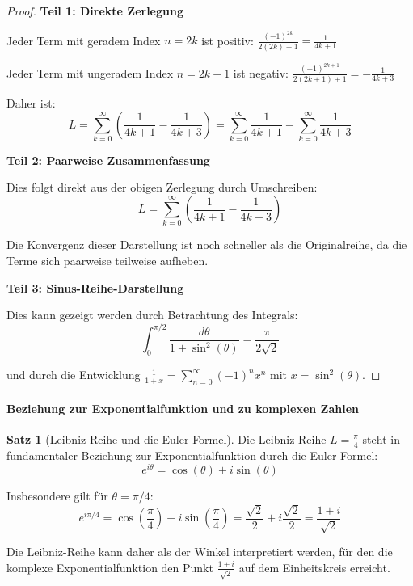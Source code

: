 \documentclass[a4paper,12pt,twoside]{report}
\theoremstyle{definition}
\newtheorem{satz}{Satz}
\begin{document}
\begin{proof}
\textbf{Teil 1: Direkte Zerlegung}

Jeder Term mit geradem Index $n = 2k$ ist positiv: $\frac{(-1)^{2k}}{2(2k)+1} = \frac{1}{4k+1}$

Jeder Term mit ungeradem Index $n = 2k+1$ ist negativ: $\frac{(-1)^{2k+1}}{2(2k+1)+1} = -\frac{1}{4k+3}$

Daher ist:
\begin{equation}
L = \sum_{k=0}^{\infty} \left( \frac{1}{4k+1} - \frac{1}{4k+3} \right) = \sum_{k=0}^{\infty} \frac{1}{4k+1} - \sum_{k=0}^{\infty} \frac{1}{4k+3}
\end{equation}

\textbf{Teil 2: Paarweise Zusammenfassung}

Dies folgt direkt aus der obigen Zerlegung durch Umschreiben:
\begin{equation}
L = \sum_{k=0}^{\infty} \left( \frac{1}{4k+1} - \frac{1}{4k+3} \right)
\end{equation}

Die Konvergenz dieser Darstellung ist noch schneller als die Originalreihe, da die Terme sich paarweise teilweise aufheben.

\textbf{Teil 3: Sinus-Reihe-Darstellung}

Dies kann gezeigt werden durch Betrachtung des Integrals:
\begin{equation}
\int_0^{\pi/2} \frac{d\theta}{1 + \sin^2(\theta)} = \frac{\pi}{2\sqrt{2}}
\end{equation}

und durch die Entwicklung $\frac{1}{1+x} = \sum_{n=0}^{\infty} (-1)^n x^n$ mit $x = \sin^2(\theta)$.
\end{proof}

\paragraph{Beziehung zur Exponentialfunktion und zu komplexen Zahlen}

\begin{satz}[Leibniz-Reihe und die Euler-Formel]
Die Leibniz-Reihe $L = \frac{\pi}{4}$ steht in fundamentaler Beziehung zur Exponentialfunktion durch die Euler-Formel:
\begin{equation}
e^{i\theta} = \cos(\theta) + i\sin(\theta)
\end{equation}

Insbesondere gilt für $\theta = \pi/4$:
\begin{equation}
e^{i\pi/4} = \cos\left(\frac{\pi}{4}\right) + i\sin\left(\frac{\pi}{4}\right) = \frac{\sqrt{2}}{2} + i\frac{\sqrt{2}}{2} = \frac{1+i}{\sqrt{2}}
\end{equation}

Die Leibniz-Reihe kann daher als der Winkel interpretiert werden, für den die komplexe Exponentialfunktion den Punkt $\frac{1+i}{\sqrt{2}}$ auf dem Einheitskreis erreicht.
\end{satz}
\end{document}
